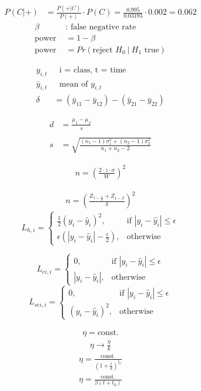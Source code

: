 \documentclass[USenglish,final,authoryear,12pt]{article}
\begin{document}
\begin{align*}
P(C | +) &= \frac{P(+ | C)}{P(+)}\cdot P(C) = \frac{0.995}{0.03193}\cdot 0.002 = 0.062
\end{align*}
\begin{align*}
	\beta &: \text{ false negative rate}\\
	\text{power }&=1-\beta\\
	\text{power }&=Pr(\text{reject }H_0~|~H_1\text{ true})
\end{align*}

\begin{align*}
	y_{i,t}&~~~\text{i = class, t = time}\\
	\bar{y}_{i,t}&~~~\text{mean of }y_{i,t}\\
	\delta &= (\bar{y}_{11} - \bar{y}_{12}) - (\bar{y}_{21} - \bar{y}_{22})
\end{align*}


\begin{align*}
	d &= \frac{\mu_1 - \mu_2}{s}\\
	&\\
	s &= \sqrt{\frac{(n_1 - 1)\sigma_1^2 + (n_2-1)\sigma_2^2}{n_1+n_2-2}}
\end{align*}

\begin{align*}
	n = \left(\frac{2\cdot z\cdot\sigma}{W}\right)^2
\end{align*}

\begin{align*}
	n = \left(\frac{Z_{1-\frac{\alpha}{2}}+Z_{1-\beta}}{\delta}\right)^2
\end{align*}
\[
L_{h,i}= 
\begin{cases}
\frac{1}{2}\left(y_i-\hat{y}_i\right)^2,& \text{if } |y_i-\hat{y}_i|\leq \epsilon\\
\epsilon(|y_i-\hat{y}_i|-\frac{\epsilon}{2}),              & \text{otherwise}
\end{cases}
\]

\[
L_{ei,i}= 
\begin{cases}
0,& \text{if } |y_i-\hat{y}_i|\leq \epsilon\\
|y_i-\hat{y}_i|,              & \text{otherwise}
\end{cases}
\]
\[
L_{sei,i}= 
\begin{cases}
0,& \text{if } |y_i-\hat{y}_i|\leq \epsilon\\
\left(y_i-\hat{y}_i\right)^2,              & \text{otherwise}
\end{cases}
\]

\begin{align*}
	\eta = \text{const.}
\end{align*}
\begin{align*}
\eta \to \frac{\eta}{k}
\end{align*}
\begin{align*}
\eta = \frac{\text{const.}}{\left(1+\frac{t}{k}\right)^{t_0}}
\end{align*}
\begin{align*}
\eta = \frac{\text{const.}}{\beta\left(t+t_0\right)}
\end{align*}
\end{document}
